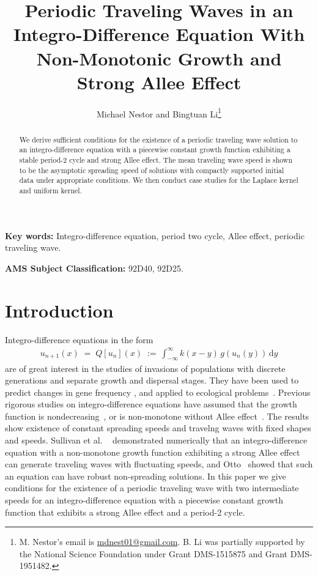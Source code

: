 \documentclass[11pt]{article}
\title{Periodic Traveling Waves in an Integro-Difference Equation With Non-Monotonic Growth and Strong Allee Effect}
\date{}
\author{Michael Nestor and Bingtuan Li\thanks{M. Nestor's email is \href{mailto:mdnest01@gmail.com}{mdnest01@gmail.com}. B. Li was partially supported by the National Science Foundation under Grant DMS-1515875 and Grant DMS-1951482.}}
\affil{Department of Mathematics, University of Louisville\linebreak Louisville, KY 40292}
\theoremstyle{definition}
\numberwithin{equation}{section}
\numberwithin{thm}{section}
\renewcommand{\d}{\,\mathrm{d}}
\begin{document}
\maketitle

\begin{abstract}
We derive sufficient conditions for the existence of a periodic traveling wave solution to an integro-difference equation with a piecewise constant growth function exhibiting a stable period-2 cycle and strong Allee effect.
The mean traveling wave speed is shown to be the asymptotic spreading speed of solutions with compactly supported initial data under appropriate conditions.
We then conduct case studies for the Laplace kernel and uniform kernel.
\end{abstract}

{\bf Key words:} Integro-difference equation, period two cycle, Allee effect, periodic traveling wave.
\newline

{\bf AMS Subject Classification:} 92D40, 92D25.

\section{Introduction}

Integro-difference equations in the form 
\begin{align}\label{q}
u_{n+1}(x)\;=\;Q[u_n](x)\;:=\,\int^{\infty}_{-\infty}k(x-y)\,g\left(u_n(y)\right) \d y
\end{align}
are of great interest in the studies of invasions of populations with discrete generations and separate growth and dispersal stages.
They have been used to predict changes in gene frequency \cite{lui82a, lui82b, lui83, slatkin, w78}, and applied to ecological problems~\cite{hh, ks, kot89, kot92, kotbook, lut, nkl,otto}.
Previous rigorous studies on integro-difference equations have assumed that the growth function is nondecreasing~\cite{w78, wein82}, or is non-monotone without Allee effect~\cite{lui83, wang}.
The results show existence of constant spreading speeds and travelng waves with fixed shapes and speeds.
Sullivan et al. ~\cite{pnas} demonstrated numerically that an integro-difference equation with a non-monotone growth function exhibiting a strong Allee effect can generate traveling waves with fluctuating speeds, and Otto~\cite{otto} showed that such an equation can have robust non-spreading solutions.
In this paper we give conditions for the existence of a periodic traveling wave with two intermediate speeds for an integro-difference equation with a piecewise constant growth function that exhibits a strong Allee effect and a period-2 cycle. 
\end{document}

